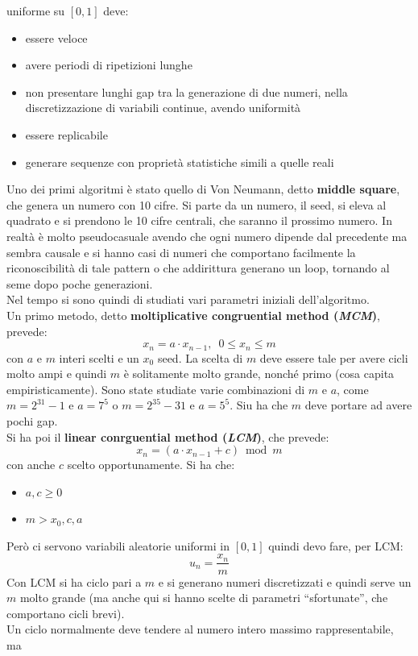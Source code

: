 \message{ !name(modprob.tex)}\documentclass[a4paper,12pt, oneside]{book}
\begin{document}
uniforme su $[0,1]$ deve:
\begin{itemize}
  \item essere veloce
  \item avere periodi di ripetizioni lunghe
  \item non presentare lunghi gap tra la generazione di due numeri, nella
  discretizzazione di variabili continue, avendo uniformità
  \item essere replicabile
 \item generare sequenze con proprietà statistiche simili a quelle reali
\end{itemize}
Uno dei primi algoritmi è stato quello di Von Neumann, detto \textbf{middle
  square}, che genera un numero con 10 cifre. Si parte da un numero, il seed, si
eleva al 
quadrato e si prendono le 10 cifre centrali, che saranno il prossimo numero. In
realtà è molto pseudocasuale avendo che ogni numero dipende dal precedente ma
sembra causale e si hanno casi di numeri che comportano facilmente la
riconoscibilità di tale pattern o che addirittura generano un loop, tornando al
seme dopo poche generazioni.  \\
Nel tempo si sono quindi di studiati vari parametri iniziali dell'algoritmo. \\
Un primo metodo, detto \textbf{moltiplicative congruential method
  (\textit{MCM})}, prevede: 
\[x_n=a\cdot x_{n-1},\,\,\,0\leq x_n\leq m\]
con $a$ e $m$ interi scelti e un $x_0$ seed. La scelta di $m$ deve essere tale
per avere cicli molto ampi e quindi $m$ è solitamente molto grande, nonché primo
(cosa capita empiristicamente). Sono state studiate varie combinazioni di $m$ e
$a$, come $m=2^{31}-1$ e $a=7^5$ o $m=2^{35}-31$ e $a=5^5$. Siu ha che $m$ deve
portare ad avere pochi gap.\\
Si ha poi il \textbf{linear conrguential method (\textit{LCM})}, che prevede:
\[x_n=(a\cdot x_{n-1}+c)\bmod m\]
con anche $c$ scelto opportunamente. Si ha che:
\begin{itemize}
  \item $a,c\geq 0$
  \item $m>x_0,c,a$
\end{itemize}
Però ci servono variabili aleatorie uniformi in $[0,1]$ quindi devo fare, per
LCM: 
\[u_n=\frac{x_n}{m}\]
Con LCM si ha ciclo pari a $m$ e si generano numeri discretizzati e quindi serve
un $m$ molto grande (ma anche qui si hanno scelte di parametri ``sfortunate'',
che comportano cicli brevi).\\
Un ciclo normalmente deve tendere al numero intero massimo rappresentabile, ma
\end{document}
